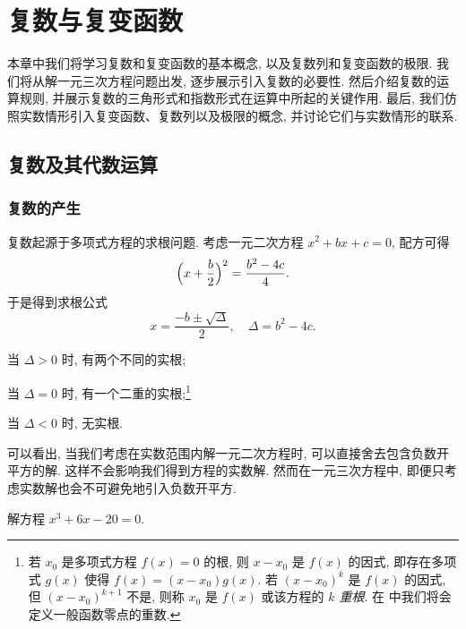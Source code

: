 \chapter{复数与复变函数}
\label{chapter:1}

\begin{widetext}
  本章中我们将学习复数和复变函数的基本概念, 以及复数列和复变函数的极限.
  我们将从解一元三次方程问题出发, 逐步展示引入复数的必要性. 然后介绍复数的运算规则, 并展示复数的三角形式和指数形式在运算中所起的关键作用. 最后, 我们仿照实数情形引入复变函数、复数列以及极限的概念, 并讨论它们与实数情形的联系.
\end{widetext}

\section{复数及其代数运算}

\subsection{复数的产生}
\label{ssec:motivation-complex-numbers}

复数起源于多项式方程的求根问题. 
考虑一元二次方程 $x^2+bx+c=0$, 配方可得
\[
  \Bigl(x+\frac b2\Bigr)^2=\frac{b^2-4c}4.
\]
于是得到求根公式
\[
  x=\frac{-b\pm\sqrt\Delta}2,\quad 
  \Delta=b^2-4c.
\]

\begin{enuma}
  \item 当 $\Delta>0$ 时, 有两个不同的实根;
  \item 当 $\Delta=0$ 时, 有一个二重的实根;\footnote{
    若 $x_0$ 是多项式方程 $f(x)=0$ 的根, 则 $x-x_0$ 是 $f(x)$ 的因式, 即存在多项式 $g(x)$ 使得 $f(x)=(x-x_0)g(x)$.
    若 $(x-x_0)^k$ 是 $f(x)$ 的因式, 但 $(x-x_0)^{k+1}$ 不是, 则称 $x_0$ 是 $f(x)$ 或该方程的 \emph{$k$ 重根}.
    在 中我们将会定义一般函数零点的重数.
  }
  \item 当 $\Delta<0$ 时, 无实根.
\end{enuma}

可以看出, 当我们考虑在实数范围内解一元二次方程时, 可以直接舍去包含\alert{负数开平方}的解.
这样不会影响我们得到方程的实数解.
然而在一元三次方程中, 即便只考虑实数解也会不可避免地引入负数开平方.

\begin{example}
  解方程 $x^3+6x-20=0$.
\end{example}

